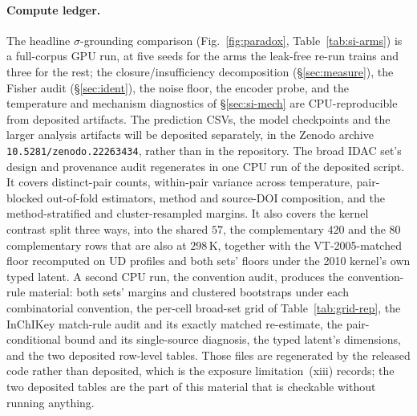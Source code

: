 \paragraph{Compute ledger.} The headline $\sigma$-grounding comparison
(Fig.~\ref{fig:paradox}, Table~\ref{tab:si-arms}) is a full-corpus GPU run, at five seeds for the
arms the leak-free re-run trains and three for the rest;
the closure/insufficiency decomposition (\S\ref{sec:measure}), the
Fisher audit (\S\ref{sec:ident}), the noise floor, the encoder probe, and the
temperature and mechanism diagnostics of \S\ref{sec:si-mech} are CPU-reproducible from
deposited artifacts. The
prediction CSVs, the model checkpoints and the larger analysis artifacts will be deposited
separately, in the Zenodo archive \texttt{10.5281/zenodo.22263434}, rather than in the
repository. The broad IDAC set's design and provenance audit regenerates in one CPU run of the deposited
script. It covers distinct-pair counts, within-pair variance across temperature, pair-blocked
out-of-fold estimators, method and source-DOI composition, and the method-stratified and
cluster-resampled margins. It also covers the kernel contrast split three ways, into the shared
$57$, the complementary $420$ and the $80$ complementary rows that are also at $298$\,K, together
with the VT-2005-matched floor recomputed on UD profiles and both sets' floors under the 2010
kernel's own typed latent. A second CPU run,
the convention audit, produces the convention-rule material: both sets'
margins and clustered bootstraps under each combinatorial convention, the per-cell broad-set
grid of Table~\ref{tab:grid-rep}, the InChIKey match-rule audit and its exactly matched re-estimate,
the pair-conditional bound and its single-source diagnosis, the typed latent's dimensions, and the
two deposited row-level tables.
Those files are regenerated by the released code rather than deposited, which is the
exposure limitation~(xiii) records; the two deposited tables are the part of this material that is
checkable without running anything.
